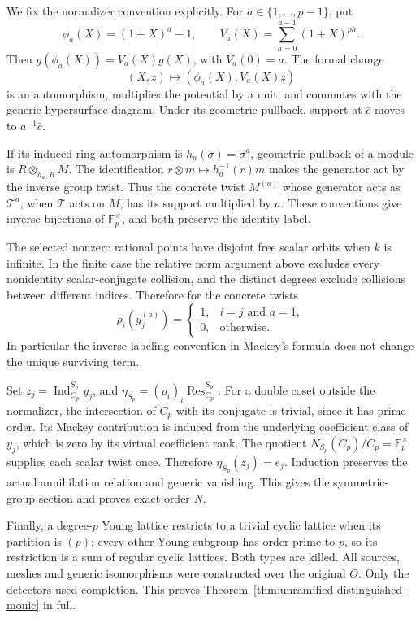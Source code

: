 We fix the normalizer convention explicitly.  For
\(a\in\{1,\ldots,p-1\}\), put
\[
 \phi_a(X)=(1+X)^a-1,\qquad
 V_a(X)=\sum_{h=0}^{a-1}(1+X)^{ph}.
\]
Then \(g(\phi_a(X))=V_a(X)g(X)\), with \(V_a(0)=a\).
The formal change
\[
 (X,z)\longmapsto(\phi_a(X),V_a(X)z)
\]
is an automorphism, multiplies the potential by a unit, and commutes
with the generic-hypersurface diagram.  Under its geometric pullback,
support at \(\bar c\) moves to \(a^{-1}\bar c\).

If its induced ring automorphism is \(h_a(\sigma)=\sigma^a\),
geometric pullback of a module is \(R\otimes_{h_a,R}M\).
The identification \(r\otimes m\mapsto h_a^{-1}(r)m\) makes
the generator act by the inverse group twist.  Thus the concrete
twist \(M^{(a)}\) whose generator acts as \(\mathcal T^a\), when
\(\mathcal T\) acts on \(M\), has its support multiplied by \(a\).
These conventions give inverse bijections of
\(\mathbb F_p^\times\), and both preserve the identity label.

The selected nonzero rational points have disjoint free scalar orbits
when \(k\) is infinite.  In the finite case the relative norm
argument above excludes every nonidentity scalar-conjugate collision,
and the distinct degrees exclude collisions between different indices.
Therefore for the concrete twists
\begin{equation}\label{eq:singular-monic-normalizer-values}
 \rho_i(y_j^{(a)})=
 \begin{cases}1,&i=j\text{ and }a=1,\\0,&\text{otherwise}.
 \end{cases}
\end{equation}
In particular the inverse labeling convention in Mackey's formula
does not change the unique surviving term.

Set \(z_j=\operatorname{Ind}_{C_p}^{S_p}y_j\), and
\(\eta_{S_p}=(\rho_i)_i\operatorname{Res}_{C_p}^{S_p}\).
For a double coset outside the normalizer, the intersection of
\(C_p\) with its conjugate is trivial, since it has prime order.
Its Mackey contribution is induced from the underlying coefficient
class of \(y_j\), which is zero by its virtual coefficient rank.
The quotient \(N_{S_p}(C_p)/C_p=\mathbb F_p^\times\) supplies
each scalar twist once.  Therefore
\(\eta_{S_p}(z_j)=e_j\).  Induction preserves the actual
annihilation relation and generic vanishing.  This gives the
symmetric-group section and proves exact order \(N\).

Finally, a degree-\(p\) Young lattice restricts to a trivial cyclic
lattice when its partition is \((p)\); every other Young subgroup
has order prime to \(p\), so its restriction is a sum of regular
cyclic lattices.  Both types are killed.  All sources, meshes and
generic isomorphisms were constructed over the original \(O\).
Only the detectors used completion.  This proves
Theorem~\ref{thm:unramified-distinguished-monic} in full.

